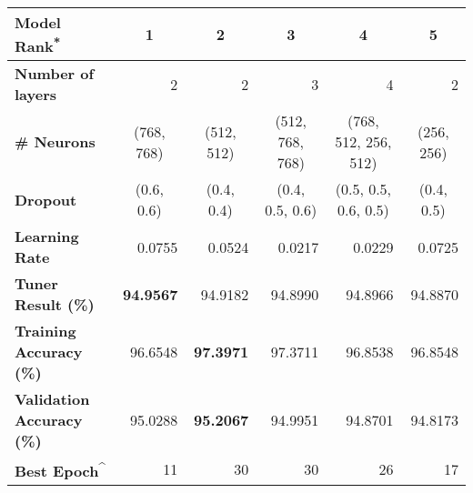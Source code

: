 \documentclass[12pt]{article}
\numberwithin{equation}{section}
\numberwithin{figure}{section}
\numberwithin{table}{section}
\begin{document}
\begin{table}[]
  \centering
  \begin{tabular}{|l|r|r|r|r|r|}
  \hline
  \textbf{Model Rank\textsuperscript{*}}                  & \multicolumn{1}{c|}{\textbf{1}} & \multicolumn{1}{c|}{\textbf{2}} & \multicolumn{1}{c|}{\textbf{3}}      & \multicolumn{1}{c|}{\textbf{4}}           & \multicolumn{1}{c|}{\textbf{5}} \\ \hline
  \textbf{Number of layers}             & 2                               & 2                               & 3                                    & 4                                         & 2                               \\ \hline
  \textbf{\# Neurons}                   & \multicolumn{1}{c|}{(768, 768)} & \multicolumn{1}{c|}{(512, 512)} & \multicolumn{1}{c|}{(512, 768, 768)} & \multicolumn{1}{c|}{(768, 512, 256, 512)} & \multicolumn{1}{c|}{(256, 256)} \\ \hline
  \textbf{Dropout}                      & \multicolumn{1}{c|}{(0.6, 0.6)} & \multicolumn{1}{c|}{(0.4, 0.4)} & \multicolumn{1}{c|}{(0.4, 0.5, 0.6)} & \multicolumn{1}{c|}{(0.5, 0.5, 0.6, 0.5)} & \multicolumn{1}{c|}{(0.4, 0.5)} \\ \hline
  \textbf{Learning Rate}                & 0.0755                          & 0.0524                          & 0.0217                               & 0.0229                                    & 0.0725                          \\ \hline
  \textbf{Tuner Result (\%)}            & \textbf{94.9567}                & 94.9182                         & 94.8990                              & 94.8966                                   & 94.8870                         \\ \hline
  \textbf{Training Accuracy (\%)}       & 96.6548                         & \textbf{97.3971}                & 97.3711                              & 96.8538                                   & 96.8548                         \\ \hline
  \textbf{Validation Accuracy (\%)}     & 95.0288                         & \textbf{95.2067}                & 94.9951                              & 94.8701                                   & 94.8173                         \\ \hline
  \textbf{Best Epoch\textsuperscript{\textasciicircum{}}} & 11                              & 30                              & 30                                   & 26                                        & 17                              \\ \hline

\end{tabular}
\end{table}
\end{document}
